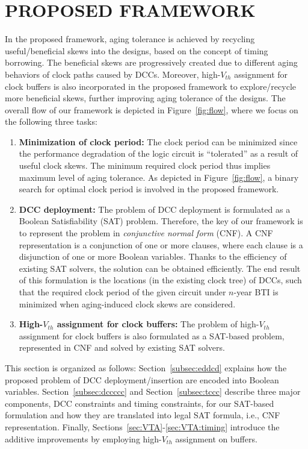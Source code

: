 \section{PROPOSED FRAMEWORK}
\label{sec:framework}
In the proposed framework, aging tolerance is achieved by recycling useful/beneficial skews into the designs, based on the concept of timing borrowing. The beneficial skews are progressively created due to different aging behaviors of clock paths caused by DCCs. Moreover, high-$V_{th}$ assignment for clock buffers is also incorporated in the proposed framework to explore/recycle more beneficial skews, further improving aging tolerance of the designs.
The overall flow of our framework is depicted in Figure~\ref{fig:flow}, where we focus on the following three tasks:
\begin{enumerate}[leftmargin=*]
	\item \textbf{Minimization of clock period:} The clock period can be minimized since the performance degradation of the logic circuit is \enquote{tolerated} as a result of useful clock skews. The minimum required clock period thus implies maximum level of aging tolerance. As depicted in Figure~\ref{fig:flow}, a binary search for optimal clock period is involved in the proposed framework.
	\item \textbf{DCC deployment:} The problem of  DCC deployment is formulated as a Boolean Satisfiability (SAT) problem. Therefore, the key of our framework is to represent the problem in \textit{conjunctive normal form} (CNF). A CNF representation is a conjunction of one or more clauses, where each clause is a disjunction of one or more Boolean variables. Thanks to the efficiency of existing SAT solvers, the solution can be obtained efficiently. The end result of this formulation is the locations (in the existing clock tree) of DCCs, such that the required clock period of the given circuit under $n$-year BTI is minimized when aging-induced clock skews are considered. 
	\item \textbf{High-$V_{th}$ assignment for clock buffers:} The problem of high-$V_{th}$ assignment for clock buffers is also formulated as a SAT-based problem, represented in CNF and solved by existing SAT solvers.
\end{enumerate}

 
 This section is organized as follows: Section~\ref{subsec:eddcd} explains how the proposed problem of DCC deployment/insertion are encoded into Boolean variables. Section~\ref{subsec:dccccc} and Section~\ref{subsec:tccc} describe three major components, DCC constraints and timing constraints, for our SAT-based formulation and how they are translated into legal SAT formula, i.e., CNF representation. Finally, Sections~\ref{sec:VTA}-\ref{sec:VTA:timing} introduce the additive improvements by employing high-$V_{th}$ assignment on buffers.

